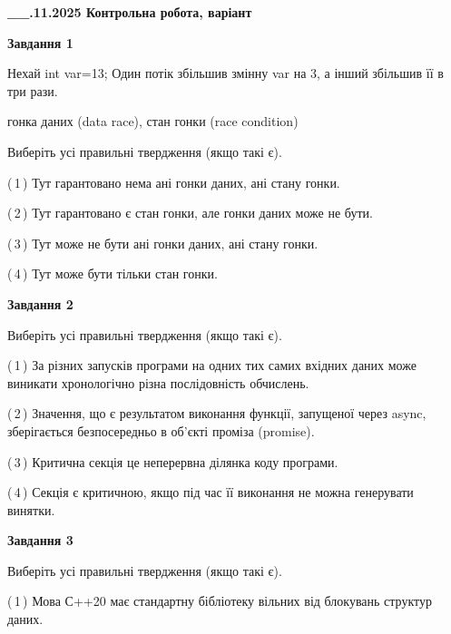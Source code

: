 \documentclass[12pt, ukrainian]{article}
\begin{document}
\begin {large}

\textbf{\_\_.11.2025 Контрольна робота, варіант  }\par


{

\begin{center}
\textbf{Завдання 1}
\end{center}
Нехай int var=13; Один потік збільшив змінну var на 3, а інший збільшив її в три рази.

гонка даних (data race), стан гонки (race condition)

Виберіть усі правильні твердження (якщо такі є).\par
\vspace{2mm}
(\,1\,) Тут гарантовано нема ані гонки даних, ані стану гонки.%

(\,2\,) Тут гарантовано є стан гонки, але гонки даних може не бути.%

(\,3\,) Тут може не бути ані гонки даних, ані стану гонки.%

(\,4\,) Тут може бути тільки стан гонки.%



\begin{center}
\textbf{Завдання 2}
\end{center}
Виберіть усі правильні твердження (якщо такі є).\par
\vspace{2mm}

(\,1\,) За різних запусків програми на одних тих самих вхідних даних може виникати хронологічно різна послідовність обчислень.%

(\,2\,) Значення, що є результатом виконання функції, запущеної через async, зберігається безпосередньо в об’єкті проміза (promise).%

(\,3\,) Критична секція це неперервна ділянка коду програми.%

(\,4\,) Секція є критичною, якщо під час її виконання не можна генерувати винятки.%



\begin{center}
\textbf{Завдання 3}
\end{center}
Виберіть усі правильні твердження (якщо такі є).\par
\vspace{2mm}

(\,1\,) Мова С++20 має стандартну бібліотеку вільних від блокувань структур даних.%

}
\end{large}
\end{document}
